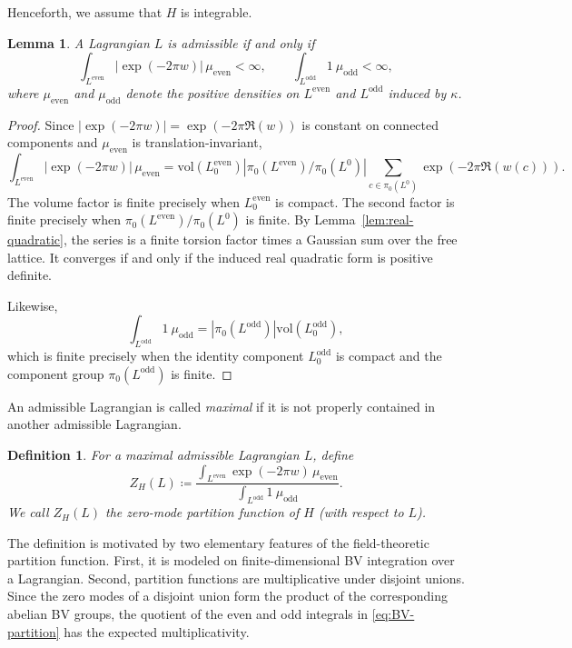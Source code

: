 \documentclass[12pt]{amsart}
\numberwithin{table}{section}
\numberwithin{equation}{section}
\newtheorem{defn}{Definition}[section]
\newtheorem{lem}{Lemma}[section]
\theoremstyle{plain}
\newcommand{\vol}{\mathrm{vol}}
\begin{document}
Henceforth, we assume that $H$ is integrable.


\begin{lem}\label{lem:integrable-admissible}
	A Lagrangian $L$ is admissible if and only if
	\[
	\int_{L^{\mathrm{even}}} \left|\exp(-2\pi w)\right|\,\mu_{\mathrm{even}}<\infty,
	\qquad
	\int_{L^{\mathrm{odd}}}1\ \mu_{\mathrm{odd}}<\infty,
	\]
	where $\mu_{\mathrm{even}}$ and $\mu_{\mathrm{odd}}$ denote the positive densities on $L^{\mathrm{even}}$ and $L^{\mathrm{odd}}$ induced by $\kappa$.
\end{lem}

\begin{proof}
	Since $|\exp(-2\pi w)|=\exp(-2\pi\Re(w))$ is constant on connected components and $\mu_{\mathrm{even}}$ is translation-invariant,
	\[
	\int_{L^{\mathrm{even}}} \left|\exp(-2\pi w)\right|\,\mu_{\mathrm{even}}
	=
	\vol(L^{\mathrm{even}}_0)
	|\pi_0(L^{\mathrm{even}})/\pi_0(L^0)|
	\sum_{c\in\pi_0(L^0)}\exp(-2\pi\Re(w(c))).
	\]
	The volume factor is finite precisely when $L^{\mathrm{even}}_0$ is compact. The second factor is finite precisely when $\pi_0(L^{\mathrm{even}})/\pi_0(L^0)$ is finite. By Lemma~\ref{lem:real-quadratic}, the series is a finite torsion factor times a Gaussian sum over the free lattice. It converges if and only if the induced real quadratic form is positive definite.
		
	Likewise,
	\[
	\int_{L^{\mathrm{odd}}}1\ \mu_{\mathrm{odd}} = |\pi_0(L^{\mathrm{odd}})|
	\vol(L^{\mathrm{odd}}_0),
	\]
	which is finite precisely when the identity component $L^{\mathrm{odd}}_0$ is compact and the component group $\pi_0(L^{\mathrm{odd}})$ is finite.
\end{proof}

An admissible Lagrangian is called  \emph{maximal} if it is not properly contained in another admissible Lagrangian.

\begin{defn}
For a maximal admissible Lagrangian $L$, define
\begin{equation}\label{eq:BV-partition}
Z_H(L)\coloneq
\frac{\displaystyle\int_{L^{\mathrm{even}}}\exp(- 2\pi w)\,\mu_{\mathrm{even}}}
{\displaystyle\int_{L^{\mathrm{odd}}}1\ \mu_{\mathrm{odd}}}.
\end{equation}
We call $Z_H(L)$ the \emph{zero-mode partition function} of $H$ (with respect to $L$).
\end{defn}

The definition is motivated by two elementary features of the field-theoretic partition function. First, it is modeled on finite-dimensional BV integration over a Lagrangian. Second, partition functions are multiplicative under disjoint unions. Since the zero modes of a disjoint union form the product of the corresponding abelian BV groups, the quotient of the even and odd integrals in \eqref{eq:BV-partition} has the expected multiplicativity. 
\end{document}

